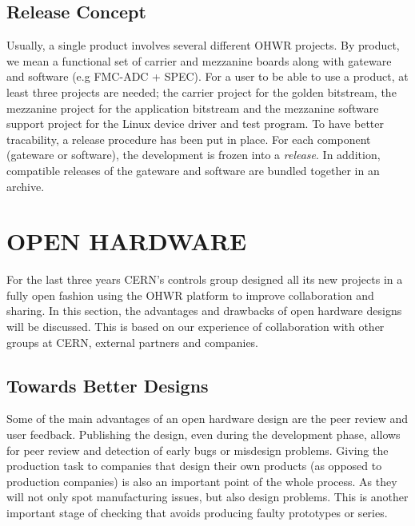 \documentclass{JAC2003}
\begin{document}
\subsection{Release Concept}
Usually, a single product involves several different OHWR projects.
By product, we mean a functional set of carrier and mezzanine boards along with gateware and software (e.g FMC-ADC + SPEC).
For a user to be able to use a product, at least three projects are needed; the carrier project for the golden bitstream, the mezzanine project for the application bitstream and the mezzanine software support project for the Linux device driver and test program.
To have better tracability, a release procedure has been put in place.
For each component (gateware or software), the development is frozen into a \textit{release}.
In addition, compatible releases of the gateware and software are bundled together in an archive.


\section{OPEN HARDWARE}
%

For the last three years CERN's controls group designed all its new projects in a fully open fashion using the OHWR platform to improve collaboration and sharing.
In this section, the advantages and drawbacks of open hardware designs will be discussed.
This is based on our experience of collaboration with other groups at CERN, external partners and companies.

\subsection{Towards Better Designs}
Some of the main advantages of an open hardware design are the peer review and user feedback.
Publishing the design, even during the development phase, allows for peer review and detection of early bugs or misdesign problems.
Giving the production task to companies that design their own products (as opposed to production companies) is also an important point of the whole process.
As they will not only spot manufacturing issues, but also design problems.
This is another important stage of checking that avoids producing faulty prototypes or series.
\end{document}

